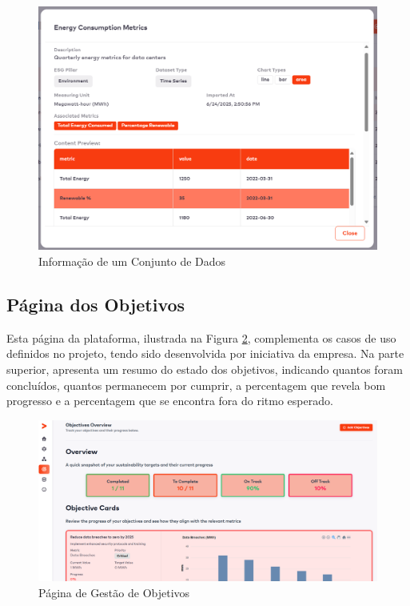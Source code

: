 \begin{figure}[H]
    \centering
    \includegraphics[width=5.5in,keepaspectratio]{frontmatter/assets/platform_prints/dataset/dataset_info.png}
    \caption{Informação de um Conjunto de Dados}
    \label{fig:dataset_info}
\end{figure}

\subsection{Página dos Objetivos}

Esta página da plataforma, ilustrada na Figura \ref{fig:objectives_done}, complementa os casos de uso definidos no projeto, tendo sido desenvolvida por iniciativa da empresa. Na parte superior, apresenta um resumo do estado dos objetivos, indicando quantos foram concluídos, quantos permanecem por cumprir, a percentagem que revela bom progresso e a percentagem que se encontra fora do ritmo esperado.

\begin{figure}[H]
    \centering
    \includegraphics[width=\linewidth,keepaspectratio]{frontmatter/assets/platform_prints/objetives/objective_done.png}
    \caption{Página de Gestão de Objetivos}
    \label{fig:objectives_done}
\end{figure}

